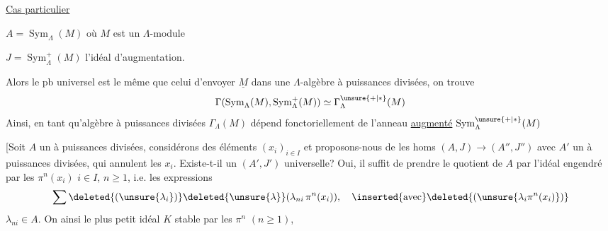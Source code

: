 \uline{Cas particulier}

$A=\operatorname{Sym}_{\Lambda}(M)$ où $M$ est un $\Lambda$-module

 $J=\operatorname{Sym}_{\Lambda}^{+}(M)$ l'idéal d'augmentation.

Alors le pb universel est le même que celui d'envoyer $\underline{M}$ dans une $\Lambda$-algèbre à puissances divisées, on trouve
\[
\Gamma(\operatorname{Sym}_{\Lambda}(M),\operatorname{Sym}_{\Lambda}^{+}(M))\simeq\Gamma_{\Lambda}^{\unsure{+|*}}(M)
\]
Ainsi, en tant qu'algèbre  à puissances divisées $\Gamma_{\Lambda}(M)$ dépend fonctoriellement de l'anneau \uline{augmenté} $\operatorname{Sym}_{\Lambda}^{\unsure{+|*}}(M)$ \unsure{---}



 [Soit $A$ un   à puissances divisées, considérons des éléments $(x_i)_{i\in I}$  et proposons-nous de  les homs $(A,J)\longrightarrow(A'',J'')$ avec $A'$ un   à puissances divisées, qui annulent les $x_i$. Existe-t-il un $(A',J')$ universelle? Oui, il suffit de prendre le quotient de $A$ par l'idéal  engendré par les $\pi^n(x_i)$ $i\in I$, $n\geq1$, i.e. les expressions
\[
\sum \deleted{(\unsure{\lambda_i})}\deleted{\unsure{\lambda}}(\lambda_{ni}\,\pi^n(x_i)),\quad\inserted{\text{avec}}\deleted{(\unsure{\lambda_i\pi^n(x_i)})}
\]
 $\lambda_{ni}\in A$. On  ainsi le plus petit idéal $K$ stable par les $\pi^n$ $(n\geq1)$,
